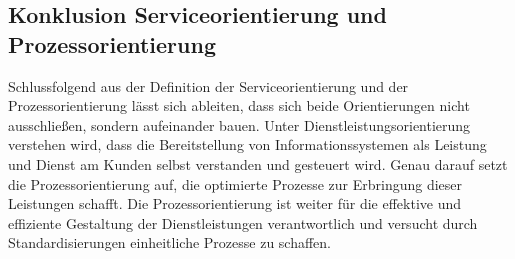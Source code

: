 \subsection{Konklusion Serviceorientierung und Prozessorientierung}
Schlussfolgend aus der Definition der Serviceorientierung und der Prozessorientierung lässt sich ableiten, dass sich beide Orientierungen nicht ausschließen, sondern aufeinander bauen. Unter Dienstleistungsorientierung verstehen wird, dass die Bereitstellung von Informationssystemen als Leistung und Dienst am Kunden selbst verstanden und gesteuert wird. Genau darauf setzt die Prozessorientierung auf, die optimierte Prozesse zur Erbringung dieser Leistungen schafft. Die Prozessorientierung ist weiter für die effektive und effiziente Gestaltung der Dienstleistungen verantwortlich und versucht durch Standardisierungen einheitliche Prozesse zu schaffen. 

